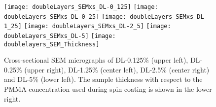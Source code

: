 \documentclass[\main/dresen_thesis.tex]{subfiles}
\begin{document}
  \begin{figure}[tb]
    \centering
    \texttt{[image: doubleLayers\_SEMxs\_DL-0\_125]}
    \texttt{[image: doubleLayers\_SEMxs\_DL-0\_25]}
    \texttt{[image: doubleLayers\_SEMxs\_DL-1\_25]}
    \texttt{[image: doubleLayers\_SEMxs\_DL-2\_5]}
    \texttt{[image: doubleLayers\_SEMxs\_DL-5]}
    \texttt{[image: doublelayers\_SEM\_Thickness]}
    \caption{\label{fig:doublelayers:layers:xs}Cross-sectional SEM micrographs of DL-0.125\% (upper left), DL-0.25\% (upper right), DL-1.25\% (center left), DL-2.5\% (center right) and DL-5\% (lower left). The sample thickness with respect to the PMMA concentration used during spin coating is shown in the lower right. }
  \end{figure}
\end{document}
